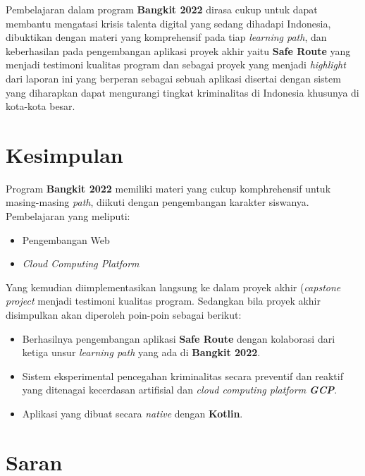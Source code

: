 Pembelajaran dalam program \textbf{Bangkit 2022} dirasa cukup untuk dapat membantu mengatasi krisis talenta digital yang sedang dihadapi Indonesia, dibuktikan dengan materi yang komprehensif pada tiap \textit{learning path}, dan keberhasilan pada pengembangan aplikasi proyek akhir yaitu \textbf{Safe Route} yang menjadi testimoni kualitas program dan sebagai proyek yang menjadi \textit{highlight} dari laporan ini yang berperan sebagai sebuah aplikasi disertai dengan sistem yang diharapkan dapat mengurangi tingkat kriminalitas di Indonesia khusunya di kota-kota besar.

\section{Kesimpulan}

Program \textbf{Bangkit 2022} memiliki materi yang cukup komphrehensif untuk masing-masing \textit{path}, diikuti dengan pengembangan karakter siswanya. Pembelajaran yang meliputi:
\begin{itemize}
    \item Pengembangan Web
    \item \textit{Cloud Computing Platform}
\end{itemize}
Yang kemudian diimplementasikan langsung ke dalam proyek akhir (\textit{capstone project} menjadi testimoni kualitas program. Sedangkan bila proyek akhir disimpulkan akan diperoleh poin-poin sebagai berikut:
\begin{itemize}
    \item Berhasilnya pengembangan aplikasi \textbf{Safe Route} dengan kolaborasi dari ketiga unsur \textit{learning path} yang ada di \textbf{Bangkit 2022}.
    \item Sistem eksperimental pencegahan kriminalitas secara preventif dan reaktif yang ditenagai kecerdasan artifisial dan \textit{cloud computing platform \textbf{GCP}}.
    \item Aplikasi yang dibuat secara \textit{native} dengan \textbf{Kotlin}.
\end{itemize}

\section{Saran}

